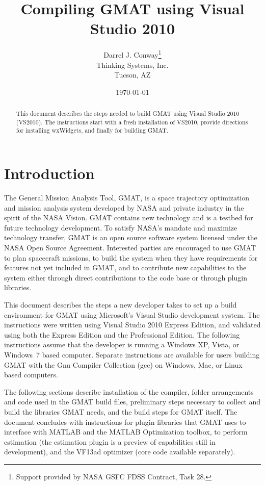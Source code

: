 \documentclass[letterpaper,10pt]{article}%
\begin{document}
\title{Compiling GMAT using Visual Studio 2010}
\author{Darrel J. Conway\thanks{Support provided by NASA GSFC FDSS Contract, Task 28.}
\\Thinking Systems, Inc.\\Tucson, AZ}
\date{\today}
\maketitle

\begin{abstract}
This document describes the steps needed to build GMAT using Visual Studio 2010 (VS2010).  The instructions start with a fresh installation of VS2010, provide directions for installing wxWidgets, and finally for building GMAT.
\end{abstract}

\section{Introduction}

The General Mission Analysis Tool, GMAT, is a space trajectory optimization and mission analysis system developed by NASA and private industry in the spirit of the NASA Vision. GMAT contains new technology and is a testbed for future technology development. To satisfy NASA's mandate and maximize technology transfer, GMAT is an open source software system licensed under the NASA Open Source Agreement.  Interested parties are encouraged to use GMAT to plan spacecraft missions, to build the system when they have requirements for features not yet included in GMAT, and to contribute new capabilities to the system either through direct contributions to the code base or through plugin libraries.

This document describes the steps a new developer takes to set up a build environment for GMAT using Microsoft's Visual Studio development system.  The instructions were written using Visual Studio 2010 Express Edition, and validated using both the Express Edition and the Professional Edition.  The following instructions assume that the developer is running a Windows XP, Vista, or Windows~7 based computer.  Separate instructions are available for users building GMAT with the Gnu Compiler Collection (gcc) on Windows, Mac, or Linux based computers.

The following sections describe installation of the compiler, folder arrangements and code used in the GMAT build files, preliminary steps necessary to collect and build the libraries GMAT needs, and the build steps for GMAT itself.  The document concludes with instructions for plugin libraries that GMAT uses to interface with MATLAB and the MATLAB Optimization toolbox, to perform estimation (the estimation plugin is a preview of capabilities still in development), and the VF13ad optimizer (core code available separately).
\end{document}
